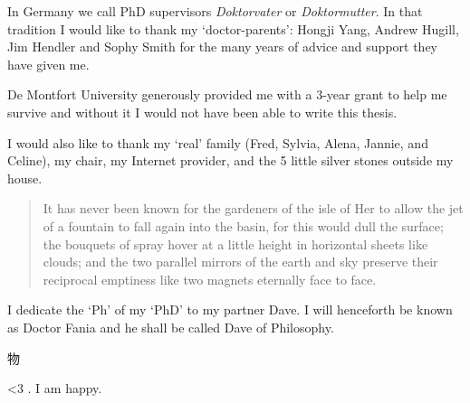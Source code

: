 
\pagestyle{fania}

\begin{wrapfigure}{L}{0.2\textwidth}
\end{wrapfigure}


In Germany we call PhD supervisors \textit{Doktorvater} or \textit{Doktormutter}. In that tradition I would like to thank my `doctor-parents': Hongji Yang, Andrew Hugill, Jim Hendler and Sophy Smith for the many years of advice and support they have given me. 

De Montfort University generously provided me with a 3-year grant to help me survive and without it I would not have been able to write this thesis.


\spirals


I would also like to thank my `real' family (Fred, Sylvia, Alena, Jannie, and Celine), my chair, my Internet provider, and the 5 little silver stones outside my house.


\spirals


\begin{quotation}
  It has never been known for the gardeners of the isle of Her to allow the jet of a fountain to fall again into the basin, for this would dull the surface; the bouquets of spray hover at a little height in horizontal sheets like clouds; and the two parallel mirrors of the earth and sky preserve their reciprocal emptiness like two magnets eternally face to face. 
\end{quotation}


\spirals



I dedicate the `Ph' of my `PhD' to my partner Dave. I will henceforth be known as Doctor Fania and he shall be called Dave of Philosophy. \textipa{["h\ae pi} \begin{CJK}{UTF8}{min}物\end{CJK} \textipa{"v3:s@ri]} <3 . I am happy.




